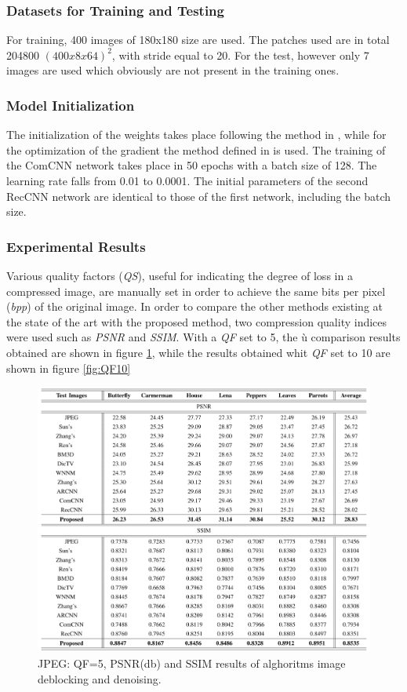 \subsubsection{Datasets for Training and Testing}
For training, 400 images of 180x180 size are used. The patches used are in 
total 204800 $ (400x8x64)^2 $, with stride equal to 20. For the test, however only 
7 images are used which obviously are not present in the training ones.

\subsubsection{Model Initialization}
The initialization of the weights takes place following the method in \cite{0799924140}, 
while for the optimization of the gradient the method defined in \cite{0799924121} is used.
The training of the ComCNN network takes place in 50 epochs with a batch 
size of 128. The learning rate falls from 0.01 to 0.0001. The initial parameters 
of the second RecCNN network are identical to those of the first network, 
including the batch size.

\subsubsection{Experimental Results}
Various quality factors (\emph{QS}), useful for indicating the degree of loss in a 
compressed image, are manually set in order to achieve the same bits per 
pixel (\emph{bpp}) of the original image. In order to compare the other methods 
existing at the state of the art with the proposed method, two compression 
quality indices were used such as \emph{PSNR} and \emph{SSIM}. With a \emph{QF} set to 5, the ù
comparison results obtained are shown in figure \ref{fig:QF5}, while the results 
obtained whit \emph{QF} set to 10 are shown in figure \ref{fig:QF10}
\begin{figure}[h!]
    \centering
    \includegraphics[width = 1 \linewidth]{images/paper3/comparison.png}
    \centering
    \caption{JPEG: QF=5, PSNR(db) and SSIM results of alghoritms image deblocking and denoising.}
    \label{fig:QF5}
\end{figure}

